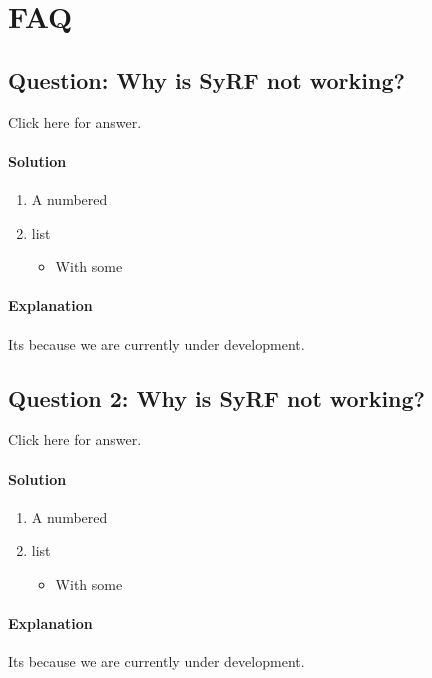 \documentclass[
]{book}
\providecommand{\tightlist}{%
  \setlength{\itemsep}{0pt}\setlength{\parskip}{0pt}}
\begin{document}
\hypertarget{faq}{%
\chapter{FAQ}\label{faq}}

\hypertarget{question-why-is-syrf-not-working}{%
\section{Question: Why is SyRF not working?}\label{question-why-is-syrf-not-working}}

Click here for answer.

\hypertarget{solution}{%
\subsubsection{Solution}\label{solution}}

\begin{enumerate}
\def\labelenumi{\arabic{enumi}.}
\tightlist
\item
  A numbered
\item
  list

  \begin{itemize}
  \tightlist
  \item
    With some
  \end{itemize}
\end{enumerate}

\hypertarget{explanation}{%
\subsubsection{Explanation}\label{explanation}}

Its because we are currently under development.

\hypertarget{question-2-why-is-syrf-not-working}{%
\section{Question 2: Why is SyRF not working?}\label{question-2-why-is-syrf-not-working}}

Click here for answer.

\hypertarget{solution-1}{%
\subsubsection{Solution}\label{solution-1}}

\begin{enumerate}
\def\labelenumi{\arabic{enumi}.}
\tightlist
\item
  A numbered
\item
  list

  \begin{itemize}
  \tightlist
  \item
    With some
  \end{itemize}
\end{enumerate}

\hypertarget{explanation-1}{%
\subsubsection{Explanation}\label{explanation-1}}

Its because we are currently under development.

  
\end{document}
